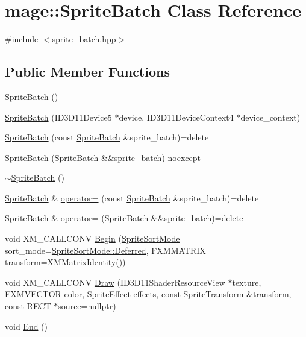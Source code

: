 \hypertarget{classmage_1_1_sprite_batch}{}\section{mage\+:\+:Sprite\+Batch Class Reference}
\label{classmage_1_1_sprite_batch}


{\ttfamily \#include $<$sprite\+\_\+batch.\+hpp$>$}

\subsection*{Public Member Functions}
\begin{DoxyCompactItemize}
\item 
\hyperlink{classmage_1_1_sprite_batch_a75924326627c792ff454d9d2a2ba1fda}{Sprite\+Batch} ()
\item 
\hyperlink{classmage_1_1_sprite_batch_a3ab8db2b1f022518a1e29b8e048a09da}{Sprite\+Batch} (I\+D3\+D11\+Device5 $\ast$device, I\+D3\+D11\+Device\+Context4 $\ast$device\+\_\+context)
\item 
\hyperlink{classmage_1_1_sprite_batch_a10fe1d6cf1d2de9e087b370e7d696be8}{Sprite\+Batch} (const \hyperlink{classmage_1_1_sprite_batch}{Sprite\+Batch} \&sprite\+\_\+batch)=delete
\item 
\hyperlink{classmage_1_1_sprite_batch_a9829fa235d66a66d7cca6a64625998e4}{Sprite\+Batch} (\hyperlink{classmage_1_1_sprite_batch}{Sprite\+Batch} \&\&sprite\+\_\+batch) noexcept
\item 
\hyperlink{classmage_1_1_sprite_batch_a1c284e2c0ed96081f9f2fb1f84e5817f}{$\sim$\+Sprite\+Batch} ()
\item 
\hyperlink{classmage_1_1_sprite_batch}{Sprite\+Batch} \& \hyperlink{classmage_1_1_sprite_batch_aa2a5df588d7589a36b38b35dc8a08a48}{operator=} (const \hyperlink{classmage_1_1_sprite_batch}{Sprite\+Batch} \&sprite\+\_\+batch)=delete
\item 
\hyperlink{classmage_1_1_sprite_batch}{Sprite\+Batch} \& \hyperlink{classmage_1_1_sprite_batch_ad46c172200bf47c10fa13fb3a70a4104}{operator=} (\hyperlink{classmage_1_1_sprite_batch}{Sprite\+Batch} \&\&sprite\+\_\+batch)=delete
\item 
void X\+M\+\_\+\+C\+A\+L\+L\+C\+O\+NV \hyperlink{classmage_1_1_sprite_batch_a0c86254b49fd51f90db1231ac08cd521}{Begin} (\hyperlink{namespacemage_a6a54e5f6cdb617cd541bd1e05d8b9a24}{Sprite\+Sort\+Mode} sort\+\_\+mode=\hyperlink{namespacemage_a9d24b35ed0bdecf8535e2b91fe0eebbaa4ed71db54748b36eeb398876b0c747ac}{Sprite\+Sort\+Mode\+::\+Deferred}, F\+X\+M\+M\+A\+T\+R\+IX transform=X\+M\+Matrix\+Identity())
\item 
void X\+M\+\_\+\+C\+A\+L\+L\+C\+O\+NV \hyperlink{classmage_1_1_sprite_batch_aa1c49a91ab7f863ec51276d496ae1e66}{Draw} (I\+D3\+D11\+Shader\+Resource\+View $\ast$texture, F\+X\+M\+V\+E\+C\+T\+OR color, \hyperlink{namespacemage_ad62ebdf0e7aae0caf1535a4ea3f056ea}{Sprite\+Effect} effects, const \hyperlink{classmage_1_1_sprite_transform}{Sprite\+Transform} \&transform, const R\+E\+CT $\ast$source=nullptr)
\item 
void \hyperlink{classmage_1_1_sprite_batch_a9764372bb18b1c24a4a2f64ab0649569}{End} ()
\end{DoxyCompactItemize}
